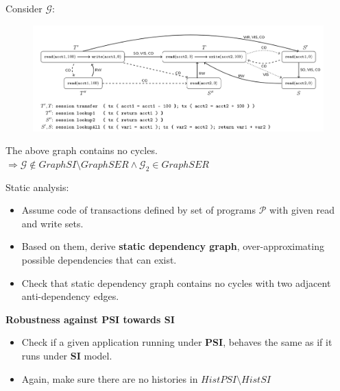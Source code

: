 \documentclass{beamer}
\begin{document}
\begin{frame}
	Consider $\mathcal{G}$:
	\begin{figure}
		\includegraphics[scale=0.25]{fig4}
	\end{figure}
	\begin{example}
		The above graph contains no cycles. \\
		$\Rightarrow \mathcal{G} \notin GraphSI \setminus GraphSER \wedge \mathcal{G}_2 \in GraphSER
		$
	\end{example}
\end{frame}

\begin{frame}
	Static analysis:
	\begin{itemize}
		\item Assume code of transactions defined by set of programs $\mathcal{P}$ with given read and write sets.
		\item Based on them, derive \textbf{static dependency graph}, over-approximating possible dependencies that can exist.
		\item Check that static dependency graph contains no cycles with two adjacent anti-dependency edges.
	\end{itemize}
\end{frame}

\begin{frame}
	\textbf{Robustness against PSI towards SI} \\
	\begin{itemize}
		\item Check if a given application running under \textbf{PSI}, behaves the same as if it runs under \textbf{SI} model.
		\item Again, make sure there are no histories in $HistPSI \setminus HistSI$
	\end{itemize}
\end{frame}
\end{document}
